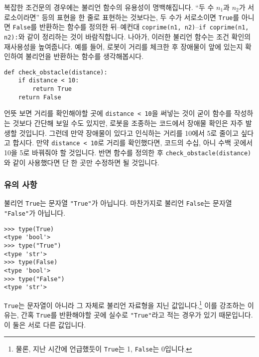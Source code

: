 \documentclass[../main.tex]{subfiles}
\begin{document}
복잡한 조건문의 경우에는 불리언 함수의 유용성이 명백해집니다.
``두 수 $n_1$과 $n_2$가 서로소이라면'' 등의 표현을 한 줄로 표현하는 것보다는, 두 수가 서로소이면 \texttt{True}를 아니면 \texttt{False}를 반환하는 함수를 정의한 뒤--예컨대 \texttt{coprime(n1, n2)}--\texttt{if coprime(n1, n2):}와 같이 정리하는 것이 바람직합니다.
나아가, 이러한 불리언 함수는 조건 확인의 재사용성을 높여줍니다.
예를 들어, 로봇이 거리를 체크한 후 장애물이 앞에 있는지 확인하여 불리언을
반환하는 함수를 생각해봅시다.
\begin{verbatim}
def check_obstacle(distance):
    if distance < 10:
        return True
    return False
\end{verbatim}
언뜻 보면 거리를 확인해야할 곳에 \verb|distance < 10|을 써넣는 것이 굳이 함수를
작성하는 것보다 간단해 보일 수도 있지만, 로봇을 조종하는 코드에서 장애물 확인은
자주 발생할 것입니다.
그런데 만약 장애물이 있다고 인식하는 거리를 10에서 5로 줄이고 싶다고 합시다.
만약 \verb|distance < 10|로 거리를 확인했다면, 코드의 수십, 아니 수백 곳에서
10을 5로 바꿔줘야 할 것입니다.
반면 함수를 정의한 후 \verb|check_obstacle(distance)|와 같이 사용했다면 단 한
곳만 수정하면 될 것입니다.

\subsubsection{유의 사항}
불리언 \texttt{True}는 문자열 \texttt{"True"}가 아닙니다.
마찬가지로 불리언 \texttt{False}는 문자열 \texttt{"False"}가 아닙니다.
\begin{verbatim}
>>> type(True)
<type 'bool'>
>>> type("True")
<type 'str'>
>>> type(False)
<type 'bool'>
>>> type("False")
<type 'str'>
\end{verbatim}
\texttt{True}는 문자열이 아니라 그 자체로 불리언 자료형을 지닌 값입니다.\footnote{물론, 지난 시간에 언급했듯이 \texttt{True}는 1, \texttt{False}는 0입니다.}
이를 강조하는 이유는, 간혹 \verb|True|를 반환해야할 곳에 실수로
\verb|"True"|라고 적는 경우가 있기 때문입니다.
이 둘은 서로 다른 값입니다.
\end{document}
